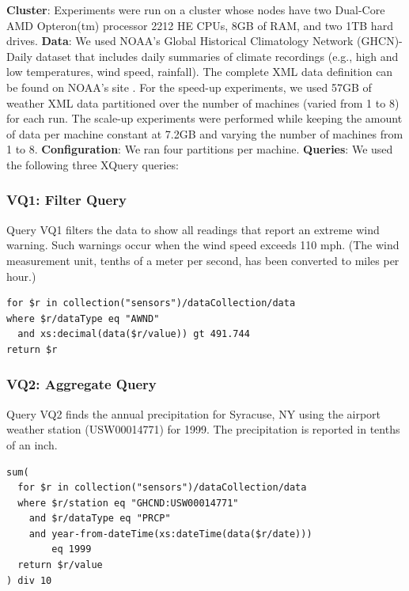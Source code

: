 \noindent \textbf{Cluster}: Experiments were run on a cluster whose nodes have two Dual-Core AMD Opteron(tm) processor 2212 HE CPUs, 8GB of RAM, and two 1TB hard drives. 
\noindent \textbf{Data}: We used NOAA's Global Historical Climatology Network (GHCN)-Daily dataset that includes daily summaries of climate recordings (e.g., high and low temperatures, wind speed, rainfall). 
The complete XML data definition can be found on NOAA's site \cite{NOAA-GHCND:website}. 
For the speed-up experiments, we used 57GB of weather  XML data partitioned over the number of machines (varied from 1 to 8) for each run.
The scale-up experiments were performed while keeping the amount of data per machine constant at 7.2GB and varying the number of machines from 1 to 8. 
\noindent \textbf{Configuration}: We ran four partitions per machine.
\noindent \textbf{Queries}: We used the following three XQuery queries:

\subsubsection*{VQ1: Filter Query}\label{query:VQ1}
Query VQ1 filters the data to show all readings that report an extreme wind warning. 
Such warnings occur when the wind speed exceeds 110 mph. 
(The wind measurement unit, tenths of a meter per second, has been converted to miles per hour.)

\begin{lstlisting}
for $r in collection("sensors")/dataCollection/data
where $r/dataType eq "AWND"
  and xs:decimal(data($r/value)) gt 491.744
return $r
\end{lstlisting}


\subsubsection*{VQ2: Aggregate Query}\label{query:VQ2}
Query VQ2 finds the annual precipitation for Syracuse, NY using the airport weather station (USW00014771) for 1999. 
The precipitation is reported in tenths of an inch. 

\begin{lstlisting}
sum(
  for $r in collection("sensors")/dataCollection/data
  where $r/station eq "GHCND:USW00014771" 
    and $r/dataType eq "PRCP" 
    and year-from-dateTime(xs:dateTime(data($r/date))) 
        eq 1999
  return $r/value
) div 10
\end{lstlisting}



